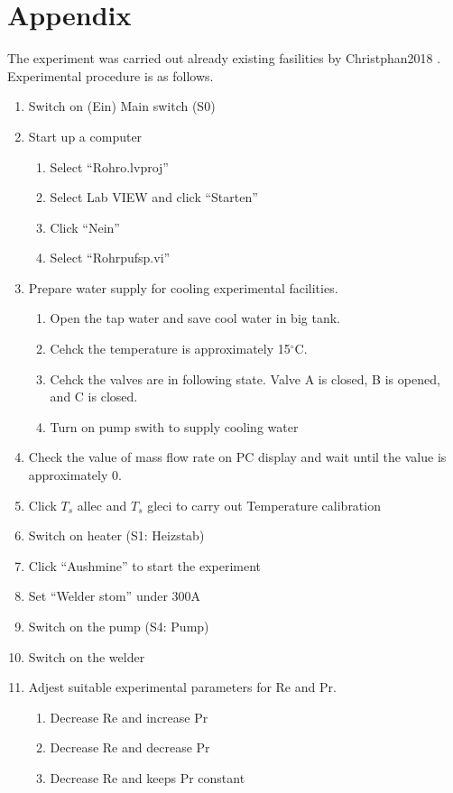 \documentclass[conference]{IEEEtran}
\begin{document}
\section{Appendix}
The experiment was carried out already existing fasilities by Christphan2018 \cite{Christphan2018}.
Experimental procedure is as follows.
\begin{enumerate}
  \item Switch on (Ein) Main switch (S0)
  \item Start up a computer
  \begin{enumerate}
      \item Select ``Rohro.lvproj''
      \item Select Lab VIEW and click ``Starten''
      \item Click ``Nein''
      \item Select ``Rohrpufsp.vi''
  \end{enumerate}
  \item Prepare water supply for cooling experimental facilities.
  \begin{enumerate}
      \item Open the tap water and save cool water in big tank.
      \item Cehck the temperature is approximately 15$^\circ$C.
      \item Cehck the valves are in following state.
      Valve A is closed, B is opened, and C is closed.
      \item Turn on pump swith to supply cooling water
  \end{enumerate}
  \item Check the value of mass flow rate on PC display and wait until the value is approximately 0.
  \item Click $T_{s}$ allec and $T_{s}$ gleci to carry out Temperature calibration
  \item Switch on heater (S1: Heizstab)
  \item Click ``Aushmine'' to start the experiment
  \item Set ``Welder stom'' under 300A
  \item Switch on the pump (S4: Pump)
  \item Switch on the welder
  \item Adjest suitable experimental parameters for Re and Pr.
  \begin{enumerate}
      \item Decrease Re and increase Pr\\
      \item Decrease Re and decrease Pr\\
      \item Decrease Re and keeps Pr constant\\


\end{enumerate}
\end{enumerate}
\end{document}
